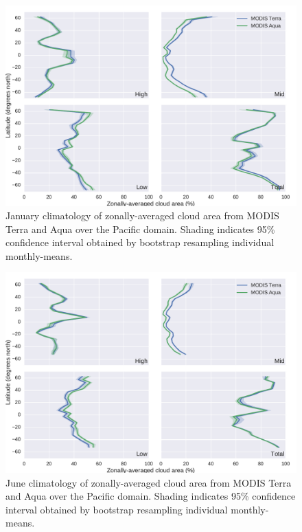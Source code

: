 \begin{figure}[htbp]
\centering
\includegraphics{graphics/misr_cldmodis_zonal_2008-01.pdf}
\caption{\label{fig:misr_cldmodis_zonal_january}January climatology of
zonally-averaged cloud area from MODIS Terra and Aqua over the Pacific
domain. Shading indicates 95\% confidence interval obtained by bootstrap
resampling individual
monthly-means.}\label{fig:misrux5fcldmodisux5fzonalux5fjanuary}
\end{figure}

\begin{figure}[htbp]
\centering
\includegraphics{graphics/misr_cldmodis_zonal_2008-06.pdf}
\caption{\label{fig:misr_cldmodis_zonal_june}June climatology of
zonally-averaged cloud area from MODIS Terra and Aqua over the Pacific
domain. Shading indicates 95\% confidence interval obtained by bootstrap
resampling individual
monthly-means.}\label{fig:misrux5fcldmodisux5fzonalux5fjune}
\end{figure}

